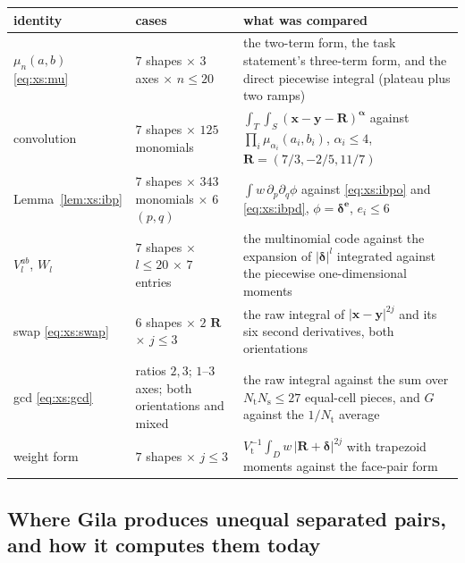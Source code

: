\begin{center}\footnotesize
\begin{tabular}{@{}L{0.20\textwidth}L{0.22\textwidth}L{0.50\textwidth}@{}}
\toprule
identity & cases & what was compared\\
\midrule
$\mu_n(a,b)$ \eqref{eq:xs:mu} & $7$ shapes $\times$ $3$ axes $\times$ $n\le20$ & the
two-term form, the task statement's three-term form, and the direct piecewise integral
(plateau plus two ramps)\\
convolution & $7$ shapes $\times$ $125$ monomials & $\int_T\!\int_S(\mathbf{x}-\mathbf{y}-\mathbf{R})^{\boldsymbol\alpha}$
against $\prod_i\mu_{\alpha_i}(a_i,b_i)$, $\alpha_i\le4$, $\mathbf{R} = (7/3,-2/5,11/7)$\\
Lemma~\ref{lem:xs:ibp} & $7$ shapes $\times$ $343$ monomials $\times$ $6$ $(p,q)$ &
$\int w\,\partial_p\partial_q\phi$ against \eqref{eq:xs:ibpo} and \eqref{eq:xs:ibpd},
$\phi = \boldsymbol\delta^{\mathbf e}$, $e_i\le6$\\
$V^{ab}_l$, $W_l$ & $7$ shapes $\times$ $l\le20$ $\times$ $7$ entries & the multinomial
code  against the expansion of $|\boldsymbol\delta|^{l}$ integrated
against the piecewise one-dimensional moments\\
swap \eqref{eq:xs:swap} & $6$ shapes $\times$ $2$ $\mathbf{R}$ $\times$ $j\le3$ & the raw
integral of $|\mathbf{x}-\mathbf{y}|^{2j}$ and its six second derivatives, both orientations\\
gcd \eqref{eq:xs:gcd} & ratios $2,3$; $1$--$3$ axes; both orientations and mixed & the raw
integral against the sum over $N_{\mathrm{t}}N_{\mathrm{s}}\le27$ equal-cell pieces, and
$G$ against the $1/N_{\mathrm{t}}$ average\\
weight form & $7$ shapes $\times$ $j\le3$ & $V_{\mathrm{t}}^{-1}\int_Dw\,|\mathbf{R}+\boldsymbol\delta|^{2j}$
with trapezoid moments against the face-pair form\\
\bottomrule
\end{tabular}
\end{center}

\subsection{Where Gila produces unequal separated pairs, and how it computes them today}
\label{sec:xs:gila}

